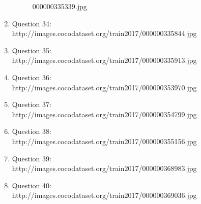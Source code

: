 \begin{enumerate}
\begin{figure}[h]
        \caption{000000335339.jpg}
    \end{figure}
    \item Question 34:\\http://images.cocodataset.org/train2017/000000335844.jpg
    \item Question 35:\\http://images.cocodataset.org/train2017/000000335913.jpg
    \item Question 36:\\http://images.cocodataset.org/train2017/000000353970.jpg
    \item Question 37:\\http://images.cocodataset.org/train2017/000000354799.jpg
    \item Question 38:\\http://images.cocodataset.org/train2017/000000355156.jpg
    \item Question 39:\\http://images.cocodataset.org/train2017/000000368983.jpg
    \item Question 40:\\http://images.cocodataset.org/train2017/000000369036.jpg
\end{enumerate}